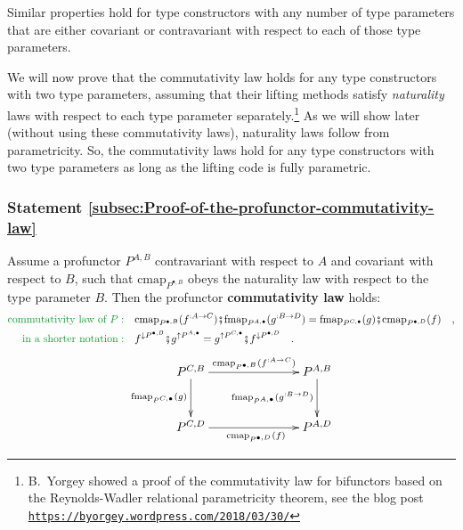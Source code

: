 Similar properties hold for type constructors with any number of type
parameters that are either covariant or contravariant with respect
to each of those type parameters.

We will now prove that the commutativity law holds for any type constructors
with two type parameters, assuming that their lifting methods satisfy
\emph{naturality} laws with respect to each type parameter separately.\footnote{B.~Yorgey showed a proof of the commutativity law for bifunctors
based on the Reynolds-Wadler relational parametricity theorem, see
the blog post \texttt{\href{https://byorgey.wordpress.com/2018/03/30/}{https://byorgey.wordpress.com/2018/03/30/}} } As we will show later (without using these commutativity laws), naturality
laws follow from parametricity. So, the commutativity laws hold for
any type constructors with two type parameters as long as the lifting
code is fully parametric.

\subsubsection{Statement \label{subsec:Proof-of-the-profunctor-commutativity-law}\ref{subsec:Proof-of-the-profunctor-commutativity-law}}

Assume a profunctor $P^{A,B}$ contravariant with respect to $A$
and covariant with respect to $B$, such that $\text{cmap}_{P^{\bullet,B}}$
obeys the naturality law with respect to the type parameter $B$.
Then the profunctor \textbf{commutativity law}
holds:
\begin{align}
{\color{greenunder}\text{commutativity law of }P:}\quad & \text{cmap}_{P^{\bullet,B}}(f^{:A\rightarrow C})\bef\text{fmap}_{P^{A,\bullet}}(g^{:B\rightarrow D})=\text{fmap}_{P^{C,\bullet}}(g)\bef\text{cmap}_{P^{\bullet,D}}(f)\quad,\nonumber \\
{\color{greenunder}\text{in a shorter notation}:}\quad & f^{\downarrow P^{\bullet,B}}\bef g^{\uparrow P^{A,\bullet}}=g^{\uparrow P^{C,\bullet}}\bef f^{\downarrow P^{\bullet,D}}\quad.\label{eq:profunctor-commutativity-law}
\end{align}
\[
\xymatrix{\xyScaleY{2.5pc}\xyScaleX{6.0pc}P^{C,B}\ar[r]\sp(0.55){\text{cmap}_{P^{\bullet,B}}(f^{:A\rightarrow C})~~~}\ar[d]\sb(0.45){\text{fmap}_{P^{C,\bullet}}(g)} & P^{A,B}\ar[d]\sb(0.45){\text{fmap}_{P^{A,\bullet}}(g^{:B\rightarrow D})}\\
P^{C,D}\ar[r]\sb(0.45){~~~~\text{cmap}_{P^{\bullet,D}}(f)} & P^{A,D}
}
\]


